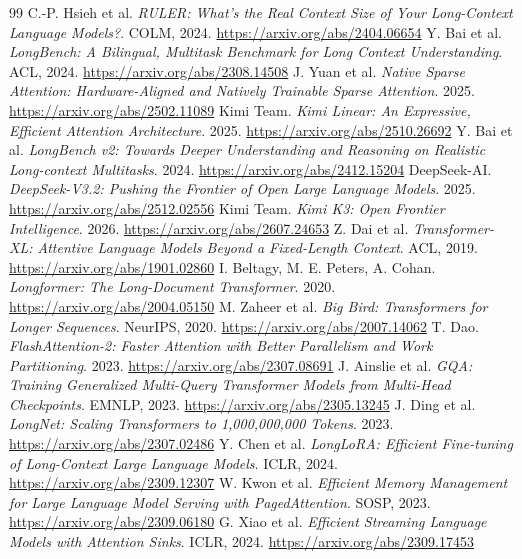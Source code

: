 \documentclass[UTF8,10pt,a4paper,fontset=none]{ctexart}
\begin{document}
\begin{thebibliography}{99}
 C.-P. Hsieh et al. \textit{RULER: What's the Real Context Size of Your Long-Context Language Models?}. COLM, 2024. \url{https://arxiv.org/abs/2404.06654}
 Y. Bai et al. \textit{LongBench: A Bilingual, Multitask Benchmark for Long Context Understanding}. ACL, 2024. \url{https://arxiv.org/abs/2308.14508}
 J. Yuan et al. \textit{Native Sparse Attention: Hardware-Aligned and Natively Trainable Sparse Attention}. 2025. \url{https://arxiv.org/abs/2502.11089}
 Kimi Team. \textit{Kimi Linear: An Expressive, Efficient Attention Architecture}. 2025. \url{https://arxiv.org/abs/2510.26692}
 Y. Bai et al. \textit{LongBench v2: Towards Deeper Understanding and Reasoning on Realistic Long-context Multitasks}. 2024. \url{https://arxiv.org/abs/2412.15204}
 DeepSeek-AI. \textit{DeepSeek-V3.2: Pushing the Frontier of Open Large Language Models}. 2025. \url{https://arxiv.org/abs/2512.02556}
 Kimi Team. \textit{Kimi K3: Open Frontier Intelligence}. 2026. \url{https://arxiv.org/abs/2607.24653}
 Z. Dai et al. \textit{Transformer-XL: Attentive Language Models Beyond a Fixed-Length Context}. ACL, 2019. \url{https://arxiv.org/abs/1901.02860}
 I. Beltagy, M. E. Peters, A. Cohan. \textit{Longformer: The Long-Document Transformer}. 2020. \url{https://arxiv.org/abs/2004.05150}
 M. Zaheer et al. \textit{Big Bird: Transformers for Longer Sequences}. NeurIPS, 2020. \url{https://arxiv.org/abs/2007.14062}
 T. Dao. \textit{FlashAttention-2: Faster Attention with Better Parallelism and Work Partitioning}. 2023. \url{https://arxiv.org/abs/2307.08691}
 J. Ainslie et al. \textit{GQA: Training Generalized Multi-Query Transformer Models from Multi-Head Checkpoints}. EMNLP, 2023. \url{https://arxiv.org/abs/2305.13245}
 J. Ding et al. \textit{LongNet: Scaling Transformers to 1,000,000,000 Tokens}. 2023. \url{https://arxiv.org/abs/2307.02486}
 Y. Chen et al. \textit{LongLoRA: Efficient Fine-tuning of Long-Context Large Language Models}. ICLR, 2024. \url{https://arxiv.org/abs/2309.12307}
 W. Kwon et al. \textit{Efficient Memory Management for Large Language Model Serving with PagedAttention}. SOSP, 2023. \url{https://arxiv.org/abs/2309.06180}
 G. Xiao et al. \textit{Efficient Streaming Language Models with Attention Sinks}. ICLR, 2024. \url{https://arxiv.org/abs/2309.17453}

\end{thebibliography}
\end{document}
